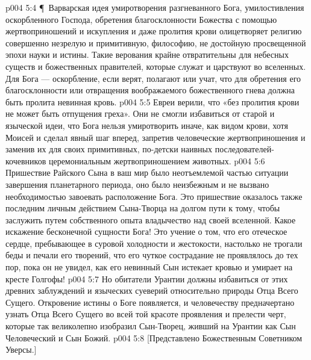 \vs p004 5:4 \P\ Варварская идея умиротворения разгневанного Бога, умилостивления оскорбленного Господа, обретения благосклонности Божества с помощью жертвоприношений и искупления и даже пролития крови олицетворяет религию совершенно незрелую и примитивную, философию, не достойную просвещенной эпохи науки и истины. Такие верования крайне отвратительны для небесных существ и божественных правителей, которые служат и царствуют во вселенных. Для Бога --- оскорбление, если верят, полагают или учат, что для обретения его благосклонности или отвращения воображаемого божественного гнева должна быть пролита невинная кровь.
\vs p004 5:5 Евреи верили, что «без пролития крови не может быть отпущения греха». Они не смогли избавиться от старой и языческой идеи, что Бога нельзя умиротворить иначе, как видом крови, хотя Моисей и сделал явный шаг вперед, запретив человеческие жертвоприношения и заменив их для своих примитивных, по\hyp{}детски наивных последователей\hyp{}кочевников церемониальным жертвоприношением животных.
\vs p004 5:6 Пришествие Райского Сына в ваш мир было неотъемлемой частью ситуации завершения планетарного периода, оно было неизбежным и не вызвано необходимостью завоевать расположение Бога. Это пришествие оказалось также последним личным действием Сына\hyp{}Творца на долгом пути к тому, чтобы заслужить путем собственного опыта владычество над своей вселенной. Какое искажение бесконечной сущности Бога! Это учение о том, что его отеческое сердце, пребывающее в суровой холодности и жестокости, настолько не трогали беды и печали его творений, что его чуткое сострадание не проявлялось до тех пор, пока он не увидел, как его невинный Сын истекает кровью и умирает на кресте Голгофы!
\vs p004 5:7 Но обитатели Урантии должны избавиться от этих древних заблуждений и языческих суеверий относительно природы Отца Всего Сущего. Откровение истины о Боге появляется, и человечеству предначертано узнать Отца Всего Сущего во всей той красоте проявления и прелести черт, которые так великолепно изобразил Сын\hyp{}Творец, живший на Урантии как Сын Человеческий и Сын Божий.
\vs p004 5:8 [Представлено Божественным Советником Уверсы.]
